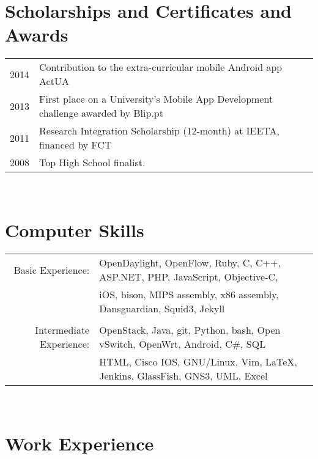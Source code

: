 \documentclass[letter,10pt]{article} %
\begin{document}

\section{Scholarships and Certificates and Awards}

\begin{tabular}{rl}
\textsc{2014} & Contribution to the extra-curricular mobile Android app ActUA \normalsize\\
\textsc{2013} & First place on a University's Mobile App Development challenge awarded by Blip.pt \normalsize\\
\textsc{2011} & Research Integration Scholarship (12-month) at IEETA, financed by FCT \normalsize\\
\textsc{2008} & Top High School finalist. \normalsize\\
\end{tabular} \\


\section{Computer Skills}

\begin{tabular}{rl}
Basic Experience:
& OpenDaylight, OpenFlow, Ruby, C, C++, ASP.NET, PHP, JavaScript, Objective-C, \\
& iOS, bison, MIPS assembly, x86 assembly, Dansguardian, Squid3, Jekyll\\
& \\
Intermediate Experience:
& OpenStack, Java, git, Python, bash, Open vSwitch, OpenWrt, Android, C\#, SQL\\
& HTML, Cisco IOS, GNU/Linux, Vim, {\LaTeX}, Jenkins, GlassFish, GNS3, UML, Excel\\
\end{tabular} \\


\section{Work Experience}
\end{document}
